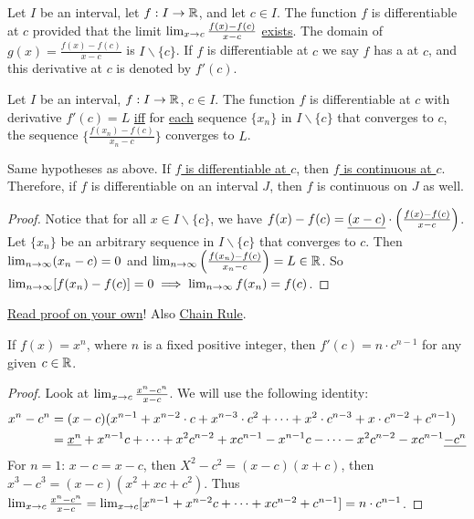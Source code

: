 \documentclass[]{article}
\begin{document}
\begin{definition}
	Let $I$ be an interval, let $f:I \rightarrow \mathbb{R}$, and let $c\in I$. The function $f$ is differentiable at $c$ provided that the limit $\lim_{x\rightarrow c} \frac{f(x) - f(c)}{x-c}$ \ul{exists}. 
	The domain of $g(x) = \frac{f(x) - f(c)}{x-c}$ is $I\backslash\{c\}$.
	If $f$ is differentiable at $c$ we say $f$ has a  at $c$, and this derivative at $c$ is denoted by \ul{$f'(c)$}.
\end{definition}
\begin{theorem}
	Let $I$ be an interval, $f:I\rightarrow\mathbb{R}$, $c\in I$.  The function $f$ is differentiable at $c$ with derivative $f'(c) = L$ \ul{iff} for \ul{each} sequence $\{x_n\}$ in $I\backslash\{c\}$ that converges to $c$, the sequence $\{\frac{f(x_n)-f(c)}{x_n-c}\}$ converges to $L$.
\end{theorem}
\begin{theorem}
	Same hypotheses as above. If \ul{$f$ is differentiable at $c$}, then \ul{$f$ is continuous at $c$}. Therefore, if $f$ is differentiable on an interval $J$, then $f$ is continuous on $J$ as well.
\end{theorem}
\begin{proof}
	Notice that for all \ul{$x\in I\backslash \{c\}$}, we have $f(x) - f(c) = \underline{(x-c)}\cdot \left(\frac{f(x)-f(c)}{x-c} \right)$. Let \ul{$\{x_n\}$} be an arbitrary sequence in $I\backslash \{c\}$ that converges to $c$. Then $\lim_{n\rightarrow\infty} (x_n - c) = 0$ and $\lim_{n\rightarrow\infty} \left( \frac{f(x_n) - f(c)}{x_n-c} \right) = L\in \mathbb{R}$. So $\lim_{n\rightarrow\infty} [f(x_n)- f(c)] = 0 \implies \lim_{n\rightarrow\infty} f(x_n) = f(c)$.
\end{proof}
\begin{theorem}
	 \ul{Read proof on your own}! Also \ul{Chain Rule}.
\end{theorem}
\begin{theorem}
	If \ul{$f(x) = x^n$}, where $n$ is a fixed positive integer, then $f'(c) = n\cdot c^{n-1}$ for any given $c\in\mathbb{R}$.
\end{theorem}
\begin{proof}
	Look at $\lim_{x\rightarrow c} \frac{x^n - c^n}{x-c}$. We will use the following identity: \begin{align*}x^n - c^n &= (x-c)(x^{n-1} + x^{n-2}\cdot c + x^{n-3}\cdot c^2 + \dots + x^2 \cdot c^{n-3} + x\cdot c^{n-2} + c^{n-1}) \\ &= \underline{x^n} + x^{n-1} c + \dots + x^2 c^{n-2} + xc^{n-1} - x^{n-1}c - \dots - x^2c^{n-2} - xc^{n-1} \underline{- c^n}\end{align*}
	For $n=1$: $x-c = x-c$, then $X^2 - c^2 = (x-c)(x+c)$, then $x^3-c^3 = (x-c)(x^2 + xc + c^2)$.
	Thus $\lim_{x\rightarrow c} \frac{x^n - c^n}{x-c} = \lim_{x\rightarrow c} [ x^{n-1} + x^{n-2}c + \dots + xc^{n-2} + c^{n-1}] = n\cdot c^{n-1}$.
\end{proof}
\end{document}

